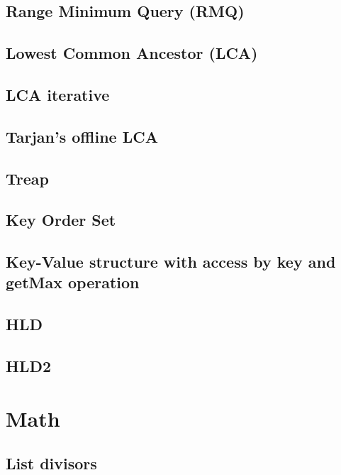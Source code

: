 \documentclass[a4paper]{article}
\begin{document}
    \subsection{Range Minimum Query (RMQ)}
        
    \subsection{Lowest Common Ancestor (LCA)}
        
    \subsection{LCA iterative}
        
    \subsection{Tarjan's offline LCA}
        
    \subsection{Treap}
        
    \subsection{Key Order Set}
        
    \subsection{Key-Value structure with access by key and getMax operation}
        
    \subsection{HLD}
        
    \subsection{HLD2}
            

\section{Math}
    \subsection{List divisors}
        
\end{document}
